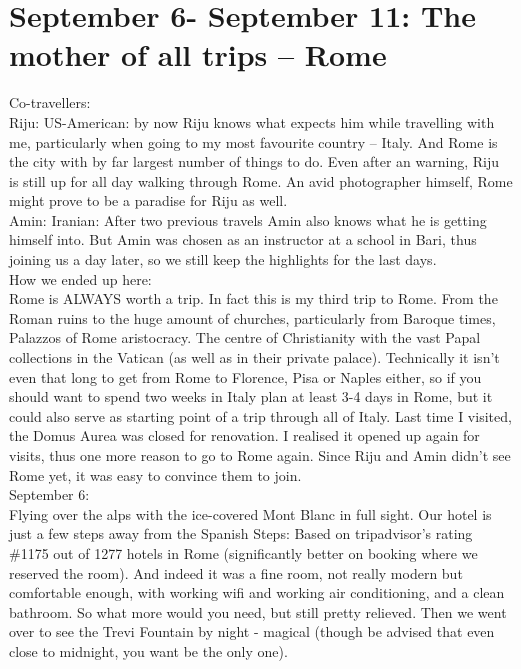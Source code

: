 \section{September 6- September 11: The mother of all trips -- Rome}
\label{2017:Rome}

Co-travellers:\\
Riju: US-American: by now Riju knows what expects him while travelling with me, particularly when going to my most favourite country -- Italy. And Rome is the city with by far largest number of things to do. Even after an warning, Riju is still up for all day walking through Rome. An avid photographer himself, Rome might prove to be a paradise for Riju as well.\\
Amin: Iranian: After two previous travels Amin also knows what he is getting himself into. But Amin was chosen as an instructor at a school in Bari, thus joining us a day later, so we still keep the highlights for the last days.\\

How we ended up here:\\
Rome is ALWAYS worth a trip. In fact this is my third trip to Rome. From the Roman ruins to the huge amount of churches, particularly from Baroque times, Palazzos of Rome aristocracy. The centre of Christianity with the vast Papal collections in the Vatican (as well as in their private palace). Technically it isn't even that long to get from Rome to Florence, Pisa or Naples either, so if you should want to spend two weeks in Italy plan at least 3-4 days in Rome, but it could also serve as starting point of a trip through all of Italy. Last time I visited, the Domus Aurea was closed for renovation. I realised it opened up again for visits, thus one more reason to go to Rome again. Since Riju and Amin didn't see Rome yet, it was easy to convince them to join.\\

September 6:\\
Flying over the alps with the ice-covered Mont Blanc in full sight. Our hotel is just a few steps away from the Spanish Steps: Based on tripadvisor's rating \#1175 out of 1277 hotels in Rome (significantly better on booking where we reserved the room). And indeed it was a fine room, not really modern but comfortable enough, with working wifi and working air conditioning, and a clean bathroom. So what more would you need, but still pretty relieved. Then we went over to see the Trevi Fountain by night - magical (though be advised that even close to midnight, you want be the only one).\\

